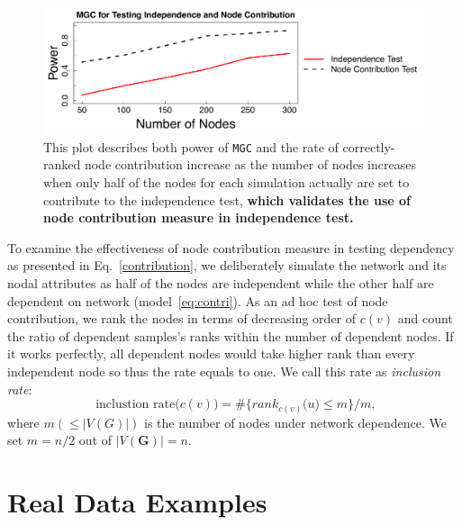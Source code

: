 \documentclass[12pt]{article}
\theoremstyle{definition}
\begin{document}
\begin{figure}[h]
	\centering
	\includegraphics[width=\linewidth]{../Figure/nodecontri.pdf}
	\caption{This plot describes both power of \texttt{MGC} and the rate of correctly-ranked node contribution increase as the number of nodes increases when only half of the nodes for each simulation actually are set to contribute to the independence test, \textbf{which validates the use of node contribution measure in independence test.}}
	\label{fig:contribution}
\end{figure}
To examine the effectiveness of node contribution measure in testing dependency as presented in Eq.~\ref{contribution}, we deliberately simulate the network and its nodal attributes as half of the nodes are independent while the other half are dependent on network (model~\ref{eq:contri}). As an ad hoc test of node contribution, we rank the nodes in terms of decreasing order of $c(v)$ and count the ratio of dependent samples's ranks within the number of dependent nodes. If it works perfectly, all dependent nodes would take higher rank than every independent node so thus the rate equals to one. We call this rate as \textit{inclusion rate}:
\begin{equation}
\mbox{ inclustion rate}\big(  c(v) \big) = \# \big\{  rank_{c(v)}\big(  u \big)  \leq  m  \big\}   /  m,
\label{eq:inclusion_rate}
\end{equation}
where $m (\leq |V(G)|)$ is the number of nodes under network dependence. We set $m=n/2$ out of $|V(\mathbf{G})| = n$.

\section{Real Data Examples}
\label{sec:real}
	
\end{document}
